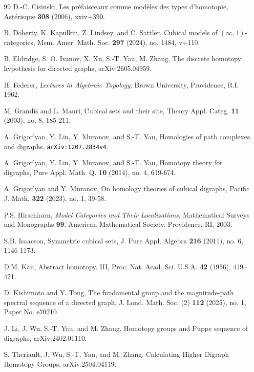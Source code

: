 \documentclass[oneside, 12pt]{amsart}
\numberwithin{equation}{section}
\theoremstyle{plain}
\theoremstyle{definition}
\theoremstyle{remark}
\begin{document}
\begin{thebibliography}{99}
		 D.-C. Cisinski, Les pr\'{e}faisceaux comme mod\`{e}les des types d'homotopie, Ast\'{e}risque \textbf{308} (2006), xxiv+390.
		
		 B. Doherty, K. Kapulkin, Z. Lindsey, and C. Sattler, Cubical models of $(\infty,1)$-categories, Mem. Amer. Math. Soc. \textbf{297} (2024), no. 1484, v+110.
		
		 B. Eldridge, S. O. Ivanov, X. Xu, S.-T. Yau, M. Zhang, The discrete homotopy hypothesis for directed graphs, arXiv:2605.04959.
		
		 H. Federer, \emph{Lectures in Algebraic Topology}, Brown University, Providence, R.I. 1962.
		
		 M. Grandis and L. Mauri, Cubical sets and their site, Theory Appl. Categ. \textbf{11} (2003), no. 8, 185-211.
		
		 A. Grigor'yan, Y. Lin, Y. Muranov, and S.-T. Yau, Homologies of path complexes and digraphs, \texttt{arXiv:1207.2834v4}.
		
		 A. Grigor'yan, Y. Lin, Y. Muranov, and S.-T. Yau, Homotopy theory for digraphs, Pure Appl. Math. Q. \textbf{10} (2014), no. 4, 619-674.
		
		 A. Grigor'yan and Y. Muranov, On homology theories of cubical digraphs, Pacific J. Math. \textbf{322} (2023), no. 1, 39-58.
		
		 P.S. Hirschhorn, \emph{Model Categories and Their Localizations}, Mathematical Surveys and Monographs \textbf{99}, American Mathematical Society, Providence, RI, 2003.
		
		 S.B. Isaacson, Symmetric cubical sets, J. Pure Appl. Algebra \textbf{216} (2011), no. 6, 1146-1173.
		
		 D.M. Kan, Abstract homotopy. III, Proc. Nat. Acad. Sci. U.S.A. \textbf{42} (1956), 419–421.
		
		 D. Kishimoto and Y. Tong, The fundamental group and the magnitude-path spectral sequence of a directed graph, J. Lond. Math. Soc. (2) \textbf{112} (2025), no. 1, Paper No. e70210.
		
		 J. Li, J. Wu, S.-T. Yau, and M. Zhang, Homotopy groups and Puppe sequence of digraphs, arXiv:2402.01110.
		
		 S. Theriault, J. Wu, S.-T. Yau, and M. Zhang, Calculating Higher Digraph Homotopy Groups, arXiv:2504.04119.
		
	\end{thebibliography}
	
\end{document}
